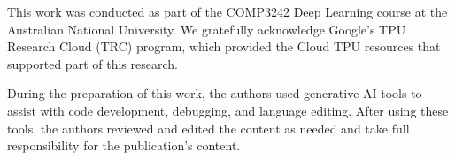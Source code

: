 \documentclass[sigconf]{ceurart}
\begin{document}


\maketitle












\begin{acknowledgments}
  This work was conducted as part of the COMP3242 Deep Learning course at the Australian National University. We gratefully acknowledge Google's TPU Research Cloud (TRC) program, which provided the Cloud TPU resources that supported part of this research.
\end{acknowledgments}

\begin{aideclaration}
  During the preparation of this work, the authors used generative AI tools to assist with code development, debugging, and language editing. After using these tools, the authors reviewed and edited the content as needed and take full responsibility for the publication's content.
\end{aideclaration}

\FloatBarrier


\end{document}
